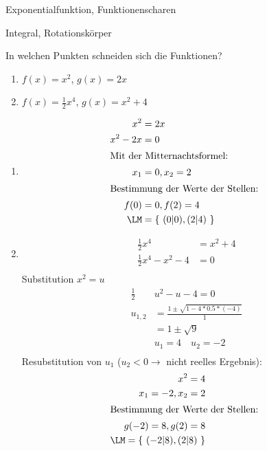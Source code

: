 


\begin{inhalt}
	\item Exponentialfunktion, Funktionenscharen
  \item Integral, Rotationskörper
\end{inhalt}


 In welchen Punkten schneiden sich die Funktionen?
\begin{multicols}{3}
  \begin{enumerate}
    \item $f(x) = x^2$, $g(x) = 2x$
    \item $f(x) = \frac 1 2 x^4$, $g(x) = x^2+4$
  \end{enumerate}
\end{multicols}

\begin{lsg}{}
  \begin{multicols}{2}
    \begin{enumerate}
      \item \begin{align*}
        x^2 &= 2x\\
        x^2-2x &= 0\\
        \intertext{Mit der Mitternachtsformel: }
        x_1 &= 0, x_2 =2\\
        \intertext{Bestimmung der Werte der Stellen: }
        f(0) &= 0, f(2) = 4\\
        \LM &= \left\{\ (0|0),(2|4) \ \right\}
      \end{align*}

      \columnbreak
      \item
      \begin{align*}
        \frac 1 2 x^4 &= x^2+4\\
        \frac 1 2 x^4 -x^2 -4 &= 0\\
      \end{align*}
      Substitution $x^2=u$
      \begin{align*}
        \frac 1 2& u^2 -u -4 = 0\\
        u_{1,2}&=\frac{1\pm\sqrt{1-4*0.5*(-4)}}{1}\\
        &= 1\pm\sqrt{9}\\
        &u_1 = 4\quad u_2=-2\\
      \end{align*}
      Resubstitution von $u_1$ ($u_2 < 0 \rightarrow $ nicht reelles Ergebnis):
      \begin{align*}
        x^2=4\\
        x_1 = -2, x_2 = 2\\
        \intertext{Bestimmung der Werte der Stellen: }
        g(-2)=8, g(2)=8\\
        \LM = \left\{\ (-2|8),(2|8) \ \right\}
      \end{align*}
    \end{enumerate}
  \end{multicols}
\end{lsg}

